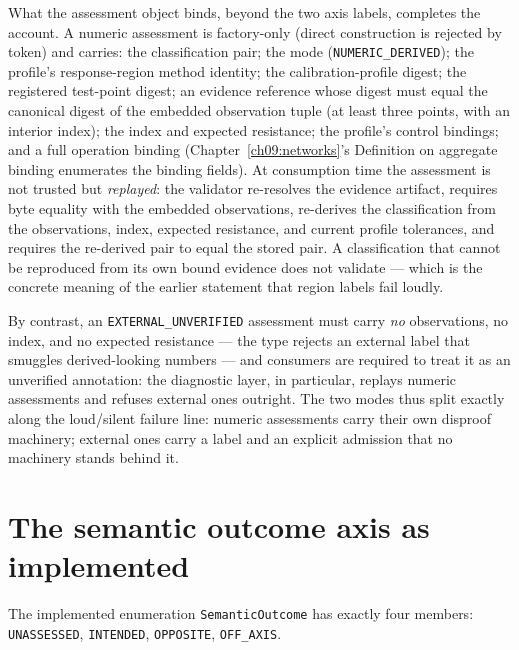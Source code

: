 What the assessment object binds, beyond the two axis labels, completes
the account. A numeric assessment is factory-only (direct construction
is rejected by token) and carries: the classification pair; the mode
(\texttt{NUMERIC\_DERIVED}); the profile's response-region method
identity; the calibration-profile digest; the registered test-point
digest; an evidence reference whose digest must equal the canonical
digest of the embedded observation tuple (at least three points, with
an interior index); the index and expected resistance; the profile's
control bindings; and a full operation binding (Chapter~\ref{ch09:networks}'s
Definition on aggregate binding enumerates the binding fields). At
consumption time the assessment is not trusted but \emph{replayed}: the
validator re-resolves the evidence artifact, requires byte equality
with the embedded observations, re-derives the classification from the
observations, index, expected resistance, and current profile
tolerances, and requires the re-derived pair to equal the stored pair.
A classification that cannot be reproduced from its own bound evidence
does not validate --- which is the concrete meaning of the earlier
statement that region labels fail loudly.

By contrast, an \texttt{EXTERNAL\_UNVERIFIED} assessment must carry
\emph{no} observations, no index, and no expected resistance --- the
type rejects an external label that smuggles derived-looking numbers
--- and consumers are required to treat it as an unverified annotation:
the diagnostic layer, in particular, replays numeric assessments and
refuses external ones outright. The two modes thus split exactly along
the loud/silent failure line: numeric assessments carry their own
disproof machinery; external ones carry a label and an explicit
admission that no machinery stands behind it.

\section{The semantic outcome axis as implemented}\label{ch07:sec:outcome}

\begin{definition}\label{ch07:def:outcome}
The implemented enumeration \texttt{SemanticOutcome} has exactly four
members: \texttt{UNASSESSED}, \texttt{INTENDED}, \texttt{OPPOSITE},
\texttt{OFF\_AXIS}.
\end{definition}

